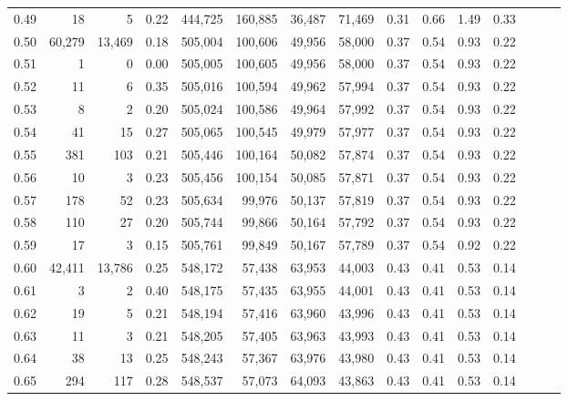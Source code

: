\begin{tabular}{rrrrrrrrrrrrrrr}
0.49 &      18 &       5 &  0.22 &  444,725 &  160,885 &   36,487 &   71,469 &  0.31 &  0.66 &  1.49 &      0.33 \\
0.50 &  60,279 &  13,469 &  0.18 &  505,004 &  100,606 &   49,956 &   58,000 &  0.37 &  0.54 &  0.93 &      0.22 \\
0.51 &       1 &       0 &  0.00 &  505,005 &  100,605 &   49,956 &   58,000 &  0.37 &  0.54 &  0.93 &      0.22 \\
0.52 &      11 &       6 &  0.35 &  505,016 &  100,594 &   49,962 &   57,994 &  0.37 &  0.54 &  0.93 &      0.22 \\
0.53 &       8 &       2 &  0.20 &  505,024 &  100,586 &   49,964 &   57,992 &  0.37 &  0.54 &  0.93 &      0.22 \\
0.54 &      41 &      15 &  0.27 &  505,065 &  100,545 &   49,979 &   57,977 &  0.37 &  0.54 &  0.93 &      0.22 \\
0.55 &     381 &     103 &  0.21 &  505,446 &  100,164 &   50,082 &   57,874 &  0.37 &  0.54 &  0.93 &      0.22 \\
0.56 &      10 &       3 &  0.23 &  505,456 &  100,154 &   50,085 &   57,871 &  0.37 &  0.54 &  0.93 &      0.22 \\
0.57 &     178 &      52 &  0.23 &  505,634 &   99,976 &   50,137 &   57,819 &  0.37 &  0.54 &  0.93 &      0.22 \\
0.58 &     110 &      27 &  0.20 &  505,744 &   99,866 &   50,164 &   57,792 &  0.37 &  0.54 &  0.93 &      0.22 \\
0.59 &      17 &       3 &  0.15 &  505,761 &   99,849 &   50,167 &   57,789 &  0.37 &  0.54 &  0.92 &      0.22 \\
0.60 &  42,411 &  13,786 &  0.25 &  548,172 &   57,438 &   63,953 &   44,003 &  0.43 &  0.41 &  0.53 &      0.14 \\
0.61 &       3 &       2 &  0.40 &  548,175 &   57,435 &   63,955 &   44,001 &  0.43 &  0.41 &  0.53 &      0.14 \\
0.62 &      19 &       5 &  0.21 &  548,194 &   57,416 &   63,960 &   43,996 &  0.43 &  0.41 &  0.53 &      0.14 \\
0.63 &      11 &       3 &  0.21 &  548,205 &   57,405 &   63,963 &   43,993 &  0.43 &  0.41 &  0.53 &      0.14 \\
0.64 &      38 &      13 &  0.25 &  548,243 &   57,367 &   63,976 &   43,980 &  0.43 &  0.41 &  0.53 &      0.14 \\
0.65 &     294 &     117 &  0.28 &  548,537 &   57,073 &   64,093 &   43,863 &  0.43 &  0.41 &  0.53 &      0.14 \\

\end{tabular}
